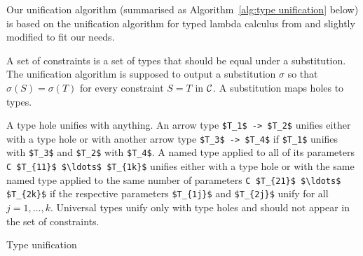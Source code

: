 Our unification algorithm (summarised as Algorithm~\ref{alg:type unification} below) is based on the unification algorithm for typed lambda calculus from \cite{pierce2002types} and slightly modified to fit our needs.

A set of constraints is a set of types that should be equal under a substitution. The unification algorithm is supposed to output a substitution $\sigma$ so that $\sigma(S) = \sigma(T)$ for every constraint $S = T$ in $\mathcal{C}$. A substitution maps holes to types.

A type hole unifies with anything. An arrow type \lstinline?$T_1$ -> $T_2$? unifies either with a type hole or with another arrow type \lstinline?$T_3$ -> $T_4$? if \lstinline?$T_1$? unifies with \lstinline?$T_3$? and \lstinline?$T_2$? with \lstinline?$T_4$?. A named type applied to all of its parameters \lstinline?C $T_{11}$ $\ldots$ $T_{1k}$? unifies either with a type hole or with the same named type applied to the same number of parameters \lstinline?C $T_{21}$ $\ldots$ $T_{2k}$? if the respective parameters \lstinline?$T_{1j}$? and \lstinline?$T_{2j}$? unify for all $j = 1, \ldots, k$. Universal  types unify only with type holes and should not appear in the set of constraints.

\begin{algorithm}
\caption{Type unification\label{alg:type unification}}

\end{algorithm} 

